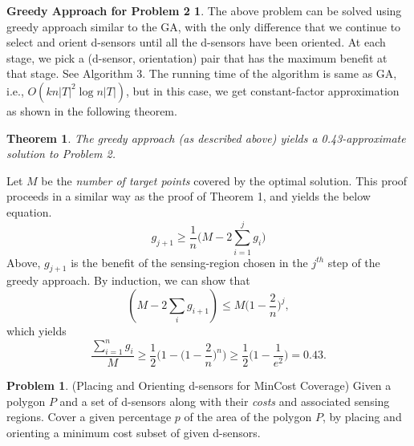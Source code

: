 \documentclass[conference]{IEEEtran}
\newtheorem{theorem}{Theorem}
\newenvironment{proof_}{{\indent \indent \it Proof:}}{\hfill $\blacksquare$\par}
\theoremstyle{definition}
\newtheorem{problem}{Problem}
\newtheorem*{GreedyApproach}{Greedy Approach for Problem 2}
\newtheorem*{NP-Hardness of Approximating the SODkC Problem}{NP-Hardness of Approximating the SODkC Problem}
\newtheorem*{Greedy Algorithm (GA)}{Greedy Algorithm (GA)}
\newtheorem*{GA on the Running Example}{GA on the Running Example}
\newtheorem*{Performance Guarantee of GA}{Performance Guarantee of GA}
\begin{document}
\begin{GreedyApproach}
The above problem can be solved using greedy approach similar to the GA, with the only difference that we continue to select and orient d-sensors until all the d-sensors have been oriented. At each stage, we pick a (d-sensor, orientation) pair that has the maximum benefit at that stage. See Algorithm 3. The running time of the algorithm is same as GA, i.e., $O(kn|T|^2 \log n|T|)$, but in this case, we get constant-factor approximation as shown in the following theorem.
\end{GreedyApproach}

\begin{algorithm}[t]
    \caption{Orienting all d-sensors for max-coverage}
\end{algorithm}

\begin{theorem}
    The greedy approach (as described above) yields a 0.43-approximate solution to Problem 2.
\end{theorem}

\begin{proof_}
    Let $M$ be the \textit{number of target points} covered by the optimal solution. This proof proceeds in a similar way as the proof of Theorem 1, and yields the below equation.
    \begin{equation*}
        g_{j+1} \geq \frac{1}{n} \Bigg(M-2\sum_{i=1}^j g_i \Bigg)
    \end{equation*}
    Above, $g_{j+1}$ is the benefit of the sensing-region chosen in the $j^{th}$ step of the greedy approach. By induction, we can show that
    \begin{equation*}
        (M - 2\sum_i g_{i+1}) \leq M \bigg(1 - \frac{2}{n} \bigg)^j,
    \end{equation*}
    which yields
    \begin{equation*}
        \frac{\sum_{i=1}^n g_i}{M} \geq \frac{1}{2} \bigg(1-\bigg(1-\frac{2}{n}\bigg)^n\bigg) \geq \frac{1}{2} \bigg(1-\frac{1}{e^2}\bigg)=0.43.
    \end{equation*}
\end{proof_}

\begin{problem}
    (Placing and Orienting d-sensors for MinCost Coverage) Given a polygon $P$ and a set of d-sensors
along with their \textit{costs} and associated sensing regions.
Cover a given percentage $p$ of the area of the polygon
$P$, by placing and orienting a minimum cost subset of
given d-sensors.
\end{problem}
\end{document}
